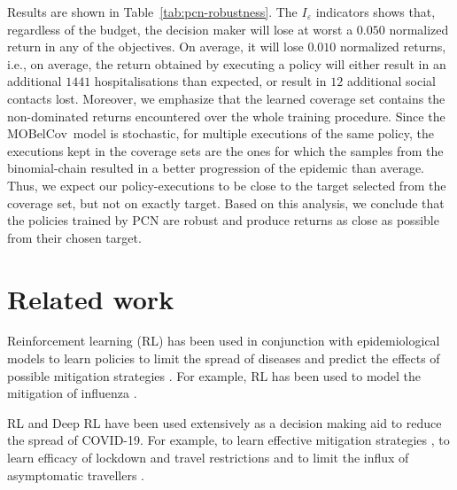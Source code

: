 \documentclass{article}
\renewcommand{\cite}[1]{\citep{#1}}
\newcommand{\momdpname}{MOBelCov}
\begin{document}
Results are shown in Table~\ref{tab:pcn-robustness}. The $I_\varepsilon$ indicators shows that, regardless of the budget, the decision maker will lose at worst a $0.050$ normalized return in any of the objectives. On average, it will lose $0.010$ normalized returns, i.e., on average, the return obtained by executing a policy will either result in an additional $1441$ hospitalisations than expected, or result in $12$ additional social contacts lost. Moreover, we emphasize that the learned coverage set contains the non-dominated returns encountered over the whole training procedure. Since the \momdpname\ model is stochastic, for multiple executions of the same policy, the executions kept in the coverage sets are the ones for which the samples from the binomial-chain resulted in a better progression of the epidemic than average. Thus, we expect our policy-executions to be close to the target selected from the coverage set, but not on exactly target. Based on this analysis, we conclude that the policies trained by PCN are robust and produce returns as close as possible from their chosen target.

\section{Related work}
Reinforcement learning (RL) has been used in conjunction with epidemiological models to learn policies to limit the spread of diseases and predict the effects of possible mitigation strategies \cite{probert2019context}. For example, RL has been used to model the mitigation of influenza \cite{das2008large,libin2020,libin2018bayesian}.
 
RL and Deep RL have been used extensively as a decision making aid to reduce the spread of COVID-19. For example, to learn effective mitigation strategies \cite{ohi2020exploring}, to learn efficacy of lockdown and travel restrictions \cite{kwak2021covid} and to limit the influx of asymptomatic travellers \cite{bastani2021efficient}.
\end{document}
